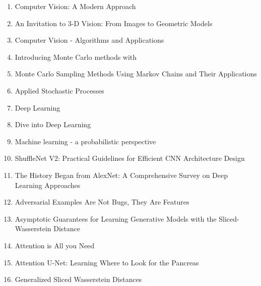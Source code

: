 \documentclass[acmlarge]{acmart}
\begin{document}
\begin{enumerate}
	\item Computer Vision: A Modern Approach \cite{Forsyth2002ComputerVA} 

	\item An Invitation to 3-D Vision: From Images to Geometric Models \cite{Ma2004AnIT} 

	\item Computer Vision - Algorithms and Applications \cite{Szeliski2011ComputerV} 

	\item Introducing Monte Carlo methods with \cite{Robert2013IntroducingMC} 

	\item Monte Carlo Sampling Methods Using Markov Chains and Their Applications \cite{Hastings1970MonteCS} 

	\item Applied Stochastic Processes \cite{Liao2013AppliedSP} 

	\item Deep Learning \cite{Goodfellow-et-al-2016} 

	\item Dive into Deep Learning \cite{zhang2020dive} 

	\item Machine learning - a probabilistic perspective \cite{Murphy2012MachineL} 

	\item ShuffleNet V2: Practical Guidelines for Efficient CNN Architecture Design \cite{Ma2018ShuffleNetVP} 

	\item The History Began from AlexNet: A Comprehensive Survey on Deep Learning Approaches \cite{Alom2018TheHB} 

	\item Adversarial Examples Are Not Bugs, They Are Features \cite{Ilyas2019AdversarialEA} 

	\item Asymptotic Guarantees for Learning Generative Models with the Sliced-Wasserstein Distance \cite{Nadjahi2019AsymptoticGF} 

	\item Attention is All you Need \cite{Vaswani2017AttentionIA} 

	\item Attention U-Net: Learning Where to Look for the Pancreas \cite{Oktay2018AttentionUL} 

	\item Generalized Sliced Wasserstein Distances \cite{Kolouri2019GeneralizedSW} 


\end{enumerate}
\end{document}

